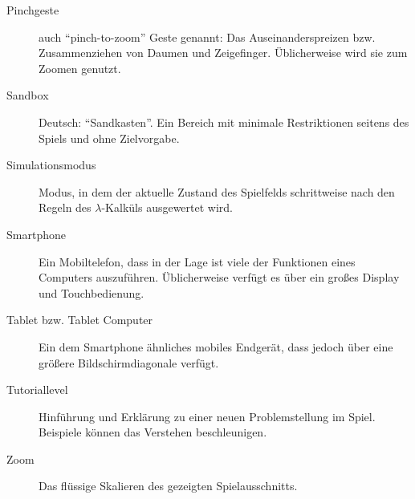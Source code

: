 \begin{description}
	\item [Pinchgeste]auch "`pinch-to-zoom"' Geste genannt: Das Auseinanderspreizen bzw. Zusammenziehen von Daumen und Zeigefinger. Üblicherweise wird sie zum Zoomen genutzt.
	\item [Sandbox] Deutsch: "`Sandkasten"'. Ein Bereich mit minimale Restriktionen seitens des Spiels und ohne Zielvorgabe.
	\item[Simulationsmodus] Modus, in dem der aktuelle Zustand des Spielfelds schrittweise nach den Regeln des \(\lambda\)-Kalküls ausgewertet wird.
	\item[Smartphone] Ein Mobiltelefon, dass in der Lage ist viele der Funktionen eines Computers auszuführen. Üblicherweise verfügt es über ein großes Display und Touchbedienung.
	\item[Tablet bzw. Tablet Computer] Ein dem Smartphone ähnliches mobiles Endgerät, dass jedoch über eine größere Bildschirmdiagonale verfügt.
	\item[Tutoriallevel] Hinführung und Erklärung zu einer neuen Problemstellung im Spiel. Beispiele können das Verstehen beschleunigen.
	\item[Zoom] Das flüssige Skalieren des gezeigten Spielausschnitts.
\end{description}

